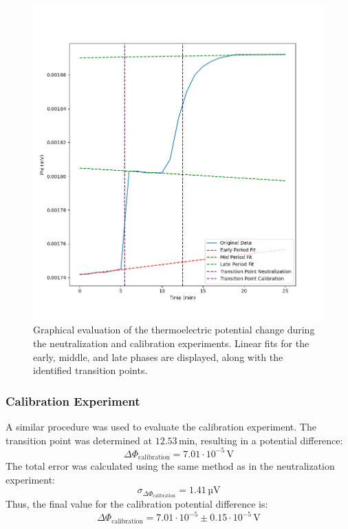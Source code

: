 \documentclass[a4paper,12pt]{article}
\begin{document}
\begin{figure}[H]
    \centering
    \includegraphics[width=\textwidth]{images/graphical_evaluation.png}
    \caption{Graphical evaluation of the thermoelectric potential change during the neutralization and calibration experiments. Linear fits for the early, middle, and late phases are displayed, along with the identified transition points.}
    \label{fig:graphical_evaluation}
\end{figure}

\subsubsection{Calibration Experiment}
A similar procedure was used to evaluate the calibration experiment. The transition point was determined at \(12.53 \, \text{min}\), resulting in a potential difference:
\[
\Delta \Phi_{\text{calibration}} = 7.01 \cdot 10^{-5} \, \text{V}
\]
The total error was calculated using the same method as in the neutralization experiment:
\[
\sigma_{\Delta \Phi_{\text{calibration}}} = 1.41 \, \text{µV}
\]
Thus, the final value for the calibration potential difference is:
\[
\Delta \Phi_{\text{calibration}} = 7.01 \cdot 10^{-5} \pm 0.15 \cdot 10^{-5} \, \text{V}
\]
\end{document}
